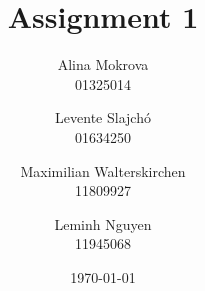 \title{Assignment 1}
\author{Alina Mokrova\\
	01325014
	\and
	Levente	Slajchó\\
	01634250
	\and
	Maximilian Walterskirchen\\
	11809927
	\and
	Leminh Nguyen\\
	11945068}
\date{\today}
